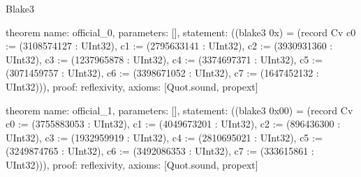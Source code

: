 \begin{lexlean}{Blake3}
\begin{semanticmodule}
theorem{
  name: official_0,
  parameters: [],
  statement: ((blake3 0x) = (record Cv {c0 := (3108574127 : UInt32), c1 := (2795633141 : UInt32), c2 := (3930931360 : UInt32), c3 := (1237965878 : UInt32), c4 := (3374697371 : UInt32), c5 := (3071459757 : UInt32), c6 := (3398671052 : UInt32), c7 := (1647452132 : UInt32)})),
  proof: reflexivity{},
  axioms: [Quot.sound, propext]
}

theorem{
  name: official_1,
  parameters: [],
  statement: ((blake3 0x00) = (record Cv {c0 := (3755883053 : UInt32), c1 := (4049673201 : UInt32), c2 := (896436300 : UInt32), c3 := (1932959919 : UInt32), c4 := (2810695021 : UInt32), c5 := (3249874765 : UInt32), c6 := (3492086353 : UInt32), c7 := (333615861 : UInt32)})),
  proof: reflexivity{},
  axioms: [Quot.sound, propext]
}
\end{semanticmodule}
\end{lexlean}
